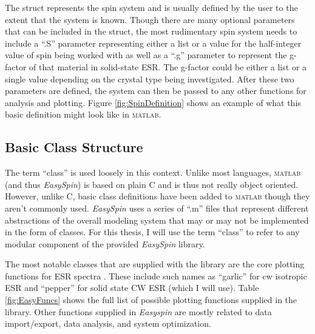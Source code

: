 \documentclass[oneside, noacknowlegments]{BYUPhys}
\begin{document}
The struct represents the spin system and is usually defined by the user to the extent that the system is known. Though there are many optional parameters that can be included in the struct, the most rudimentary spin system needs to include a ``.S'' parameter representing either a list or a value for the half-integer value of spin being worked with as well as a ``.g'' parameter to represent the g-factor of that material in solid-state ESR. The g-factor could be either a list or a single value depending on the crystal type being investigated. After these two parameters are defined, the system can then be passed to any other functions for analysis and plotting. Figure \ref{fig:SpinDefinition} shows an example of what this basic definition might look like in \textsc{matlab}.

\subsection{Basic Class Structure}

The term ``class'' is used loosely in this context. Unlike most languages, \textsc{matlab} (and thus \textit{EasySpin}) is based on plain C and is thus not really object oriented. However, unlike C, basic class definitions have been added to \textsc{matlab} though they aren't commonly used. \textit{EasySpin} uses a series of ``.m'' files that represent different abstractions of the overall modeling system that may or may not be implemented in the form of classes. For this thesis, I will use the term ``class'' to refer to any modular component of the provided \textit{EasySpin} library.

The most notable classes that are supplied with the library are the core plotting functions for ESR spectra \cite{RefWorks:doc:589299f4e4b0d4c09201f915}. These include such names as ``garlic'' for cw isotropic ESR and ``pepper'' for solid state CW ESR (which I will use). Table \ref{fig:EasyFuncs} shows the full list of possible plotting functions supplied in the library. Other functions supplied in \textit{Easyspin} are mostly related to data import/export, data analysis, and system optimization.
\end{document}
